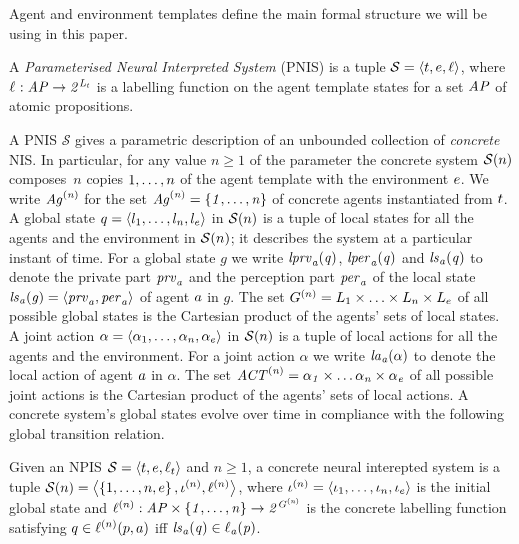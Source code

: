 Agent and environment templates define the main formal structure we will be
using in this paper.

\begin{definition}
  A {\em Parameterised Neural Interpreted System} (PNIS) is a tuple $\mathcal S
  = \left \langle {t}, {e}, \ell \right \rangle$, where $\ell_{} : \it{AP} \rightarrow
  2^{L_{t}}$ is a labelling function on the agent  template states for a set
  $\it{AP}$ of atomic propositions.
\end{definition}

A PNIS $\mathcal S$ gives a  parametric description of an unbounded collection
of {\em concrete} NIS. In particular, for any value $n \geq 1$ of the parameter
the concrete system $\mathcal{S}(n)$ composes~$n$ copies ${1}, \ldots, {n}$ of the
agent template with the environment ${e}$. We write $\it{Ag}^{(n)}$ for the set
$\it{Ag}^{(n)} = \left \{ {1}, \ldots, {n} \right \}$ of concrete agents instantiated from ${t}$.   A global state $q = \left \langle l_{1}, \ldots, l_{n}, l_{e} \right \rangle$ in
$\mathcal{S}(n)$ is a tuple of local states for all the agents and the environment in
$\mathcal{S}(n)$; it describes the system at a particular instant of time.  For a global
state $g$ we write $\it{lprv}_{a}(q)$, $\it{lper}_{a}(q)$ and $\it{ls}_{a}(q)$ to denote the
private part $\it{prv}_{a}$ and the perception part $\it{per}_{a}$ of the local state
$\it{ls}_{a}(g) = \left \langle \it{prv}_{a}, \it{per}_{a} \right \rangle$ of agent ${a}$ in $g$.  The set
$G^{(n)} = L_{1} \times \ldots \times L_{n} \times L_e$ of all
possible global states is the Cartesian product of the agents’ sets of local
states.  A joint action $\alpha = \left \langle \alpha_1, \ldots, \alpha_n, \alpha_e \right \rangle$
in $\mathcal{S}(n)$ is a tuple of local actions for all the agents and the environment.
For a joint action $\alpha$ we write $\it{la}_{a}({\alpha})$ to denote the local action
of agent ${a}$ in $\alpha$.  The set $\it{ACT}^{(n)} = \it{\alpha}_{1} \times \ldots \it{\alpha}_{n}
\times \it{\alpha}_{e}$ of all possible joint actions is the Cartesian product of the
agents’ sets of local actions.  A concrete system's global states evolve over
time in compliance with the following global transition relation.


\begin{definition}
  \label{def:concreteystem}
Given an NPIS $\mathcal S = \left \langle {t}, {e}, \ell_t \right \rangle$ and $n \geq 1$, a
concrete neural interepted system is a tuple $\mathcal{S}(n) = \left \langle  \left \{ {1},
\ldots, {n}, {e} \right \}, \iota^{({n})}, \ell^{(n)} \right \rangle$, where $\iota^{({n})} =
\left \langle \iota_{1}, \ldots, \iota_{n}, \iota_{e} \right \rangle$ is the initial global state and
$\ell^{(n)} :  \it{AP} \times \left \{ 1, \ldots, n  \right \} \rightarrow 2^{G^{(n)}}$ is the concrete labelling function satisfying $q \in \ell^{(n)}(p,a)$ iff
$\it{ls}_{a}(q) \in \ell_{a}(p)$.
\end{definition}

